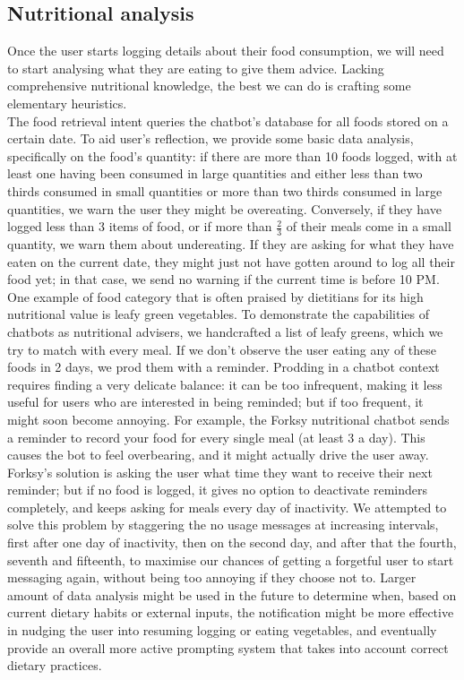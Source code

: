 \subsection{Nutritional analysis}
Once the user starts logging details about their food consumption, we will need to start analysing what they are eating to give them advice. Lacking comprehensive nutritional knowledge, the best we can do is crafting some elementary heuristics. \\
The food retrieval intent queries the chatbot's database for all foods stored on a certain date. To aid user's reflection, we provide some basic data analysis, specifically on the food's quantity: if there are more than 10 foods logged, with at least one having been consumed in large quantities and either less than two thirds consumed in small quantities or more than two thirds consumed in large quantities, we warn the user they might be overeating. Conversely, if they have logged less than 3 items of food, or if more than $\frac{2}{3}$ of their meals come in a small quantity, we warn them about undereating. If they are asking for what they have eaten on the current date, they might just not have gotten around to log all their food yet; in that case, we send no warning if the current time is before 10 PM.\\
One example of food category that is often praised by dietitians for its high nutritional value \cite{} is leafy green vegetables. To demonstrate the capabilities of chatbots as nutritional advisers, we handcrafted a list of leafy greens, which we try to match with every meal. If we don't observe the user eating any of these foods in 2 days, we prod them with a reminder. Prodding in a chatbot context requires finding a very delicate balance: it can be too infrequent, making it less useful for users who are interested in being reminded; but if too frequent, it  might soon become annoying. For example, the Forksy nutritional chatbot \cite{forksywebsite} sends a reminder to record your food for every single meal (at least 3 a day). This causes the bot to feel overbearing, and it might actually drive the user away. Forksy's solution is asking the user what time they want to receive their next reminder; but if no food is logged, it gives no option to deactivate reminders completely, and keeps asking for meals every day of inactivity. We attempted to solve this problem by staggering the no usage messages at increasing intervals, first after one day of inactivity, then on the second day, and after that the fourth, seventh and fifteenth, to maximise our chances of getting a forgetful user to start messaging again, without being too annoying if they choose not to. Larger amount of data analysis might be used in the future to determine when, based on current dietary habits or external inputs, the notification might be more effective in nudging the user into resuming logging or eating vegetables, and eventually provide an overall more active prompting system that takes into account correct dietary practices.

